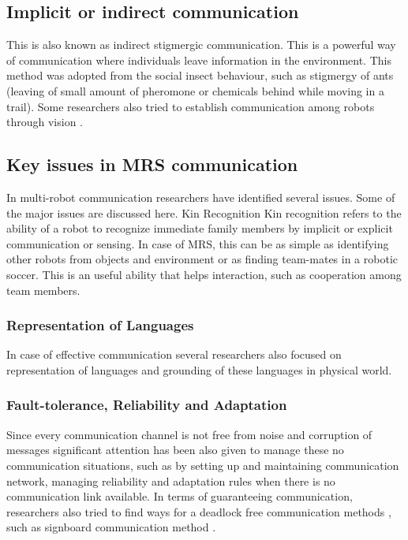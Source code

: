 \subsection*{Implicit or indirect communication} 
This is also known as indirect stigmergic communication. This is a powerful way of communication where individuals leave information in the environment. This method was adopted from the social insect behaviour, such as stigmergy of ants (leaving of small amount of pheromone or chemicals behind while moving in a trail). Some researchers also tried to establish communication among robots through vision \cite{Kuniyoshi1994}.

\subsection{Key issues in MRS communication}
In multi-robot communication researchers have identified several issues. Some of the major issues are discussed here.
Kin Recognition
Kin recognition refers to the ability of a robot to recognize immediate family members by implicit or explicit communication or sensing. In case of MRS, this can be as simple as identifying other robots from objects and environment or as finding team-mates in a robotic soccer. This is an useful ability that helps interaction, such as cooperation among team members. 

\subsubsection*{Representation of Languages}
In case of effective communication several researchers also focused on representation of languages and grounding of these languages in physical world.

\subsubsection*{Fault-tolerance, Reliability and Adaptation}  
Since every communication channel is not free from noise and corruption of messages significant attention has been also given to manage these no communication situations, such as by setting up and maintaining communication network, managing reliability and adaptation rules when there is no communication link available. In terms of guaranteeing communication, researchers also tried to find ways for a deadlock free communication methods \cite{Arkin1998}, such as signboard communication method \cite{Wang1989}.


